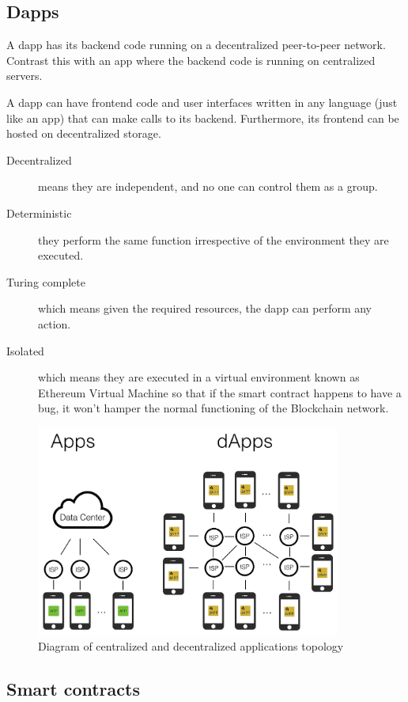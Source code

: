 \subsection{Dapps}

A dapp has its backend code running on a decentralized peer-to-peer network. Contrast this with an app where the backend code is running on centralized servers.

A dapp can have frontend code and user interfaces written in any language (just like an app) that can make calls to its backend. Furthermore, its frontend can be hosted on decentralized storage.\cite{ethereumcommunityEthereumDevelopmentDocumentation}

\begin{description}
\item[Decentralized] means they are independent, and no one can control them as a group.
\item[Deterministic] they perform the same function irrespective of the environment they are executed.
\item[Turing complete] which means given the required resources, the dapp can perform any action.
\item[Isolated] which means they are executed in a virtual environment known as Ethereum Virtual Machine so that if the smart contract happens to have a bug, it won’t hamper the normal functioning of the Blockchain network.
\end{description}

\begin{figure}[H]
	\centering
		\includegraphics[width=10cm]{images/chapter2/dapps.png}
		\caption{{\footnotesize Diagram of centralized and decentralized applications topology}}
\end{figure}

\subsection{Smart contracts}

